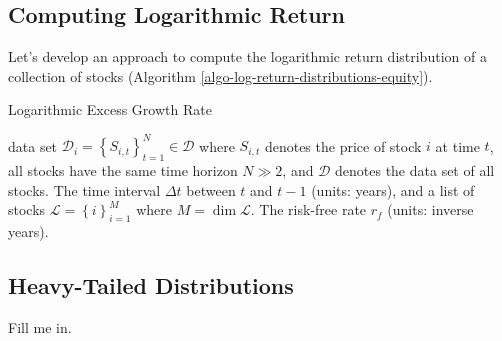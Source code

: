 \documentclass[11pt]{article}
\theoremstyle{definition}
\begin{document}
\subsection{Computing Logarithmic Return}\label{subsec:log-return-distributions-equity}
Let's develop an approach to compute the logarithmic return distribution of a collection of stocks (Algorithm \ref{algo-log-return-distributions-equity}). 
\begin{algorithm}[h]
    \caption{Logarithmic Excess Growth Rate}\label{algo-log-return-distributions-equity}
    \begin{algorithmic}[1]

        \Statex
        \Require data set $\mathcal{D}_{i} = \left\{S_{i,t}\right\}_{t=1}^{N}\in\mathcal{D}$ where $S_{i,t}$ denotes the price of stock $i$ at time $t$, all stocks have the same time horizon $N\gg{2}$, 
		and $\mathcal{D}$ denotes the data set of all stocks.
        \Require The time interval $\Delta{t}$ between $t$ and $t-1$ (units: years), and a list of stocks $\mathcal{L} = \left\{i\right\}_{i=1}^{M}$ where $M = \dim\mathcal{L}$.
        \Require The risk-free rate $r_{f}$ (units: inverse years).
     
        \Statex
            \EndFor
        \EndFor
        \Statex
		\EndProcedure
    \end{algorithmic}
\end{algorithm}

\subsection{Heavy-Tailed Distributions}\label{sec:heavy-tailed-distributions}
Fill me in.
\end{document}
